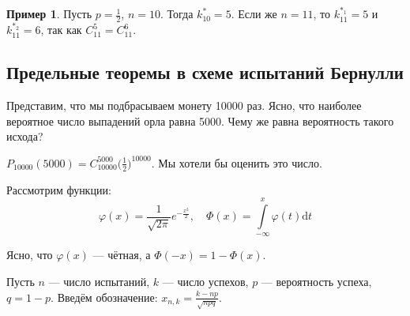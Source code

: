 \documentclass[11pt,openany,a4paper]{scrartcl}
\theoremstyle{plain}
\theoremstyle{definition}
\newtheorem{example}[theorem]{Пример}
\begin{document}
\begin{example}
    Пусть $p = \frac{1}{2}$, $n = 10$. Тогда $k_{10}^\ast = 5$. Если же $n = 11$, то
    $k_{11}^{\ast_1} = 5$ и $k_{11}^{\ast_2} = 6$, так как $C_{11}^5 = C_{11}^6$.
\end{example}

\subsection{Предельные теоремы в схеме испытаний Бернулли}

Представим, что мы подбрасываем монету 10000 раз. Ясно, что наиболее вероятное число 
выпадений орла равна 5000. Чему же равна вероятность такого исхода?

$P_{10000}(5000) = C_{10000}^{5000}\big(\frac{1}{2}\big)^{10000}$. Мы хотели бы оценить это 
число.

Рассмотрим функции:
$$
\varphi(x) = \frac{1}{\sqrt{2\pi}}e^{-\frac{x^2}{2}},
\quad \Phi(x) = \int\limits_{-\infty}^x \varphi(t)\mathrm dt
$$

Ясно, что $\varphi(x)$ — чётная, а $\Phi(-x) = 1 -\Phi(x)$.

Пусть $n$ — число испытаний, $k$ — число успехов, $p$ — вероятность успеха, $q=1-p$.
Введём обозначение: $x_{n,k} = \frac{k - np}{\sqrt{npq}}$.
\end{document}
